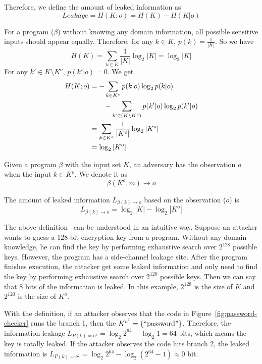 Therefore, we define the amount of leaked information as
\begin{displaymath}
    Leakage = H(K;o) = H(K) - H(K|o)
\end{displaymath}

For a program ($\beta$) without knowing any domain information, all possible sensitive
inputs should appear equally. Therefore, for any $k \in K$, $p(k) =
\frac{1}{|K|}$. So we have
$$H(K) = \sum_{k {\in} K}\frac{1}{|K|}\log_2{|K|} = \log_2{|K|}$$
For any $k' \in K \setminus K^o$, $p(k'|o) = 0$. We get
\begin{align*}
    H(K;o) & = - \sum_{k {\in} K^o}{p(k|o)\log_2p(k|o)}                         \\
           & \qquad   - \sum_{k` {\in} (K \setminus K^o)}{p(k'|o)\log_2p(k'|o)} \\
           & = \sum_{k {\in} K^o}\frac{1}{|K^o|}\log_2{|K^o|}                   \\
           & = \log_2{|K^o|}
\end{align*}


\begin{mydef}
    \label{def}
    Given a program $\beta$ with the input set $K$,
    an adversary has the observation $o$ when the input $k{\in}K^o$.
    We denote it as
    $$\beta(K^o, m) \rightarrow	o$$

    The amount of leaked information $L_{\beta(k)\rightarrow o}$ based on the observation ($o$) is
    $$L_{\beta(k)\rightarrow o} = \log_2{|K|} - \log_2{|K^o|}$$
\end{mydef}

The above definition~\cite{AskarovC12} can be understood in an intuitive way. Suppose an attacker
wants to guess a 128-bit encryption key from a program. 
Without any domain knowledge, 
he can find the key by performing exhaustive search over $2^{128}$ possible keys. 
However, the program has a side-channel leakage site. After the program finishes execution, the
attacker get some leaked information and only need to find the key by performing 
exhaustive search over $2^{120}$ possible keys. Then we can say that 8 bits of the information
is leaked. In this example, $2^{128}$ is the size of $K$ and $2^{120}$ is the size of $K^o$.


With the definition, if an attacker observes that the code in
Figure~\ref{fig:password-checker} runs the branch 1, then the $K^{o^{1}} =
\{\mathrm{``password"}\}$. Therefore, the information leakage $L_{P(k)=o^{1}} =
\log_2{2^{64}} - \log_2{1} = 64$ bits, which means the key is totally leaked. If
the attacker observes the code hits branch 2, the leaked information is
$L_{P(k)=o^{2}} = \log_2{2^{64}} - \log_2{(2^{64}-1)} \approx 0$ bit.


